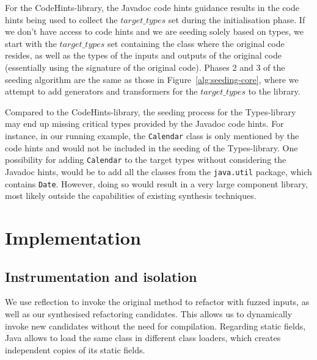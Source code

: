 \documentclass[sigconf,review,anonymous]{acmart}
\begin{document}
For the CodeHints-library, the Javadoc code hints guidance results in the code hints being
used to collect the $target\_types$ set during the initialisation phase.
If we don't have access to code hints and we are seeding solely
based on types, we start with the $target\_types$ set containing
the class where the original code resides, as well as the types of the inputs and outputs of the
original code (essentially using the signature of the original code).
Phases 2 and 3 of the seeding algorithm are the same as those in Figure~\ref{alg:seeding-core},
where we attempt to add generators and transformers for the $target\_types$ to the library.


Compared to the CodeHints-library, the seeding process for the Types-library may end up missing critical types provided by the Javadoc code hints. For instance, in our running example, the \texttt{Calendar} class is only mentioned by the
code hints and would not be included in the seeding of the Types-library.
One possibility for adding
\texttt{Calendar} to the target types without considering
the Javadoc hints, would be to add all the classes from the
\texttt{java.util} package, which contains \texttt{Date}. However, doing so would result
in a very large component library, most likely outside the capabilities of existing
synthesis techniques.

  \section{Implementation} \label{sec:implementation}



\subsection{Instrumentation and isolation}

We use reflection to invoke the original method to refactor with fuzzed inputs,
as well as our synthesised refactoring candidates. This allows us to dynamically
invoke new candidates without the need for compilation.
Regarding static fields, Java
allows to load the same class in different class loaders, which creates
independent copies of its static fields.
\end{document}
